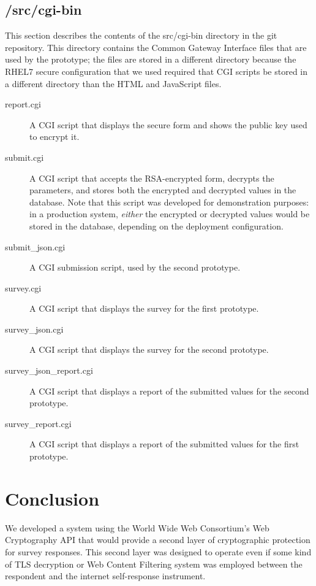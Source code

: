 \documentclass[fleqn,12pt]{wlscirep}
\begin{document}
\subsection{/src/cgi-bin}
This section describes the contents of the src/cgi-bin directory in
the git repository. This directory contains the Common Gateway
Interface files that are used by the prototype; the files are stored
in a different directory because the RHEL7 secure configuration that
we used required that CGI scripts be stored in a different directory
than the HTML and JavaScript files.

\begin{description}

  \item[report.cgi] A CGI script that displays the secure form and
    shows the public key used to encrypt it.
    \item[submit.cgi] A CGI script that accepts the RSA-encrypted
      form, decrypts the parameters, and stores both the encrypted and
      decrypted values in the database. Note that this script was
      developed for demonstration purposes: in a production system,
      \emph{either} the encrypted or decrypted values would be stored
      in the database, depending on the deployment configuration.
      \item[submit\_json.cgi] A CGI submission script, used by the
        second prototype.
      \item[survey.cgi] A CGI script that displays the survey for the
        first prototype.
      \item[survey\_json.cgi] A CGI script that displays the survey
        for the second prototype.
      \item[survey\_json\_report.cgi] A CGI script that displays a
        report of the submitted values for the second prototype. 
      \item[survey\_report.cgi] A  CGI script that displays a
        report of the submitted values for the first prototype.
\end{description}        


\section{Conclusion}
We developed a system using the World Wide Web Consortium's Web
Cryptography API that would provide a second layer of cryptographic
protection for survey responses. This second layer was designed to
operate even if some kind of TLS decryption or Web Content Filtering
system was employed between the respondent and the internet
self-response instrument.
\end{document}
